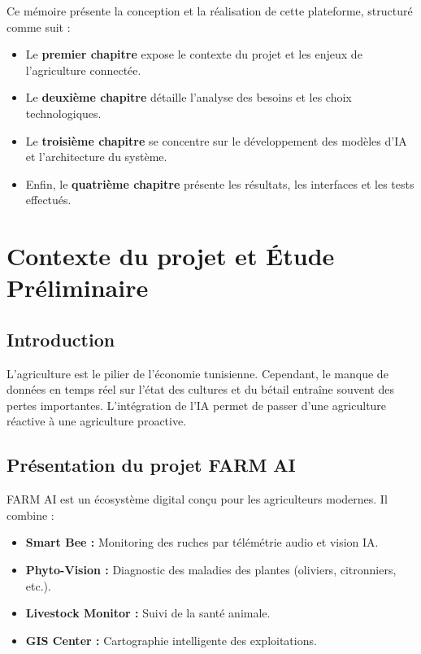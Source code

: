 \documentclass[12pt,a4paper,oneside]{report}
\begin{document}
Ce mémoire présente la conception et la réalisation de cette plateforme, structuré comme suit :
\begin{itemize}
  \item Le \textbf{premier chapitre} expose le contexte du projet et les enjeux de l'agriculture connectée.
  \item Le \textbf{deuxième chapitre} détaille l'analyse des besoins et les choix technologiques.
  \item Le \textbf{troisième chapitre} se concentre sur le développement des modèles d'IA et l'architecture du système.
  \item Enfin, le \textbf{quatrième chapitre} présente les résultats, les interfaces et les tests effectués.
\end{itemize}

\chapter{Contexte du projet et Étude Préliminaire}

\section{Introduction}
L'agriculture est le pilier de l'économie tunisienne. Cependant, le manque de données en temps réel sur l'état des cultures et du bétail entraîne souvent des pertes importantes. L'intégration de l'IA permet de passer d'une agriculture réactive à une agriculture proactive.

\section{Présentation du projet FARM AI}
FARM AI est un écosystème digital conçu pour les agriculteurs modernes. Il combine :
\begin{itemize}
    \item \textbf{Smart Bee :} Monitoring des ruches par télémétrie audio et vision IA.
    \item \textbf{Phyto-Vision :} Diagnostic des maladies des plantes (oliviers, citronniers, etc.).
    \item \textbf{Livestock Monitor :} Suivi de la santé animale.
    \item \textbf{GIS Center :} Cartographie intelligente des exploitations.
\end{itemize}
\end{document}
